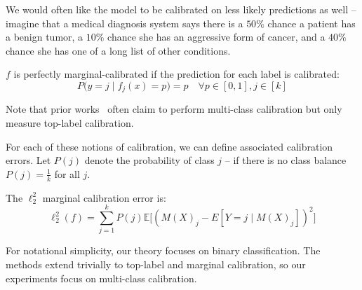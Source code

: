 We would often like the model to be calibrated on less likely predictions as well -- imagine that a medical diagnosis system says there is a $50\%$ chance a patient has a benign tumor, a $10\%$ chance she has an aggressive form of cancer, and a $40\%$ chance she has one of a long list of other conditions.

\begin{definition}
$f$ is perfectly marginal-calibrated if the prediction for each label is calibrated:
\[ P\Big(y = j \; | \; f_j(x) = p\Big) = p \quad \forall p \in [0, 1], j \in [k] \]
\end{definition}

Note that prior works~\cite{guo2017calibration, hendrycks2019anomaly, hendrycks2019pretraining} often claim to perform multi-class calibration but only measure top-label calibration.

For each of these notions of calibration, we can define associated calibration errors.
Let $P(j)$ denote the probability of class $j$ -- if there is no class balance $P(j) = \frac{1}{k}$ for all $j$. 

\begin{definition}
The $\ell_2^2$ marginal calibration error is:
\[ \ell_2^2(f) = \sum_{j = 1}^k P(j) \mathbb{E}\big[ (M(X)_j - E[Y = j \; | \; M(X)_j])^2 \big] \]
\end{definition}


For notational simplicity, our theory focuses on binary classification.
The methods extend trivially to top-label and marginal calibration, so our experiments focus on multi-class calibration.

